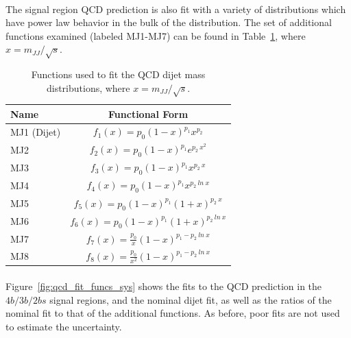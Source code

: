 \paragraph{}
The signal region QCD prediction is also fit with a variety of distributions which have power law behavior in the bulk of the distribution. 
The set of additional functions examined (labeled MJ1-MJ7) can be found in Table~\ref{tab:fit_funcs}, where $x = m_{JJ} / \sqrt{s}$.

\begin{table}[htb!]
\begin{center} 
\begin{tabular}{  l | c}
Name & Functional Form \\
\hline
MJ1 (Dijet) & $f_{1}(x) = p_0 (1-x)^{p_1} x^{p_2}$ \\
MJ2 & $f_{2}(x) = p_0 (1-x)^{p_1} e^{p_2\ x^2}$ \\
MJ3 & $f_{3}(x) = p_0 (1-x)^{p_1} x^{p_2\ x}$ \\
MJ4 & $f_{4}(x) = p_0 (1-x)^{p_1} x^{p_2\ ln\ x}$ \\
MJ5 & $f_{5}(x) = p_0 (1-x)^{p_1} (1+x)^{p_2\ x}$ \\
MJ6 & $f_{6}(x) = p_0 (1-x)^{p_1} (1+x)^{p_2\ ln\ x}$ \\
MJ7 & $f_{7}(x) = \frac{p_0}{x} (1-x)^{p_1 - p_2\ ln\ x}$ \\
MJ8 & $f_{8}(x) = \frac{p_0}{x^2} (1-x)^{p_1 - p_2\ ln\ x}$ \\
\hline
\end{tabular}
\caption{Functions used to fit the QCD dijet mass distributions, where $x = m_{JJ} / \sqrt{s}$.}
\label{tab:fit_funcs}
\end{center}
\end{table}

\paragraph{}
Figure~\ref{fig:qcd_fit_funcs_sys} shows the fits to the QCD prediction in the $4b/3b/2bs$ signal regions, and the nominal dijet fit, as well as the ratios of the nominal fit to that of the additional functions.
As before, poor fits are not used to estimate the uncertainty.

